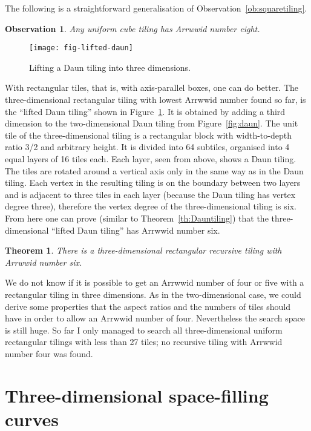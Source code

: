 \documentclass[11pt,a4paper]{article}
\newtheorem{theorem}{Theorem}
\newtheorem{observation}{Observation}
\begin{document}
The following is a straightforward generalisation of Observation~\ref{ob:squaretiling}.
\begin{observation}\label{ob:cubetiling}
Any uniform cube tiling has Arrwwid number eight.
\end{observation}

\begin{figure}
\centering
\texttt{[image: fig-lifted-daun]}
\caption{Lifting a Daun tiling into three dimensions.}
\label{fig:lifted-daun}
\end{figure}

\label{sec:3dliftedDaun}
With rectangular tiles, that is, with axis-parallel boxes, one can do better. The three-dimensional rectangular tiling with lowest Arrwwid number found so far, is the ``lifted Daun tiling'' shown in Figure~\ref{fig:lifted-daun}. It is obtained by adding a third dimension to the two-dimensional Daun tiling from Figure~\ref{fig:daun}. The unit tile of the three-dimensional tiling is a rectangular block with width-to-depth ratio 3/2 and arbitrary height. It is divided into 64 subtiles, organised into 4 equal layers of 16 tiles each. Each layer, seen from above, shows a Daun tiling. The tiles are rotated around a vertical axis only in the same way as in the Daun tiling. Each vertex in the resulting tiling is on the boundary between two layers and is adjacent to three tiles in each layer (because the Daun tiling has vertex degree three), therefore the vertex degree of the three-dimensional tiling is six. From here one can prove (similar to Theorem~\ref{th:Dauntiling}) that the three-dimensional ``lifted Daun tiling'' has Arrwwid number six.

\begin{theorem}\label{th:lifteddauntiling}
There is a three-dimensional rectangular recursive tiling with Arrwwid number six.
\end{theorem}

We do not know if it is possible to get an Arrwwid number of four or five with a rectangular tiling in three dimensions. As in the two-dimensional case, we could derive some properties that the aspect ratios and the numbers of tiles should have in order to allow an Arrwwid number of four. Nevertheless the search space is still huge. So far I only managed to search all three-dimensional uniform rectangular tilings with less than 27 tiles; no recursive tiling with Arrwwid number four was found.

\section{Three-dimensional space-filling curves}
\end{document}
